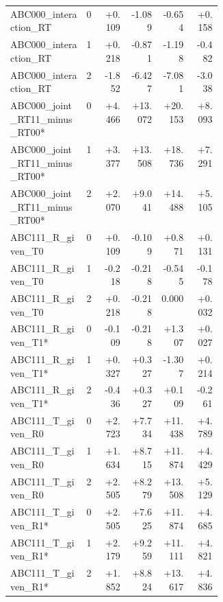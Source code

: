 \begin{longtable}{@{}p{0.36\linewidth}rrrrr@{}}
ABC000\_\allowbreak{}interaction\_\allowbreak{}RT & 0 & +0.109 & -1.089 & -0.654 & +0.158 \\
ABC000\_\allowbreak{}interaction\_\allowbreak{}RT & 1 & +0.218 & -0.871 & -1.198 & -0.482 \\
ABC000\_\allowbreak{}interaction\_\allowbreak{}RT & 2 & -1.852 & -6.427 & -7.081 & -3.038 \\
ABC000\_\allowbreak{}joint\_\allowbreak{}RT11\_\allowbreak{}minus\_\allowbreak{}RT00* & 0 & +4.466 & +13.072 & +20.153 & +8.093 \\
ABC000\_\allowbreak{}joint\_\allowbreak{}RT11\_\allowbreak{}minus\_\allowbreak{}RT00* & 1 & +3.377 & +13.508 & +18.736 & +7.291 \\
ABC000\_\allowbreak{}joint\_\allowbreak{}RT11\_\allowbreak{}minus\_\allowbreak{}RT00* & 2 & +2.070 & +9.041 & +14.488 & +5.105 \\
ABC111\_\allowbreak{}R\_\allowbreak{}given\_\allowbreak{}T0 & 0 & +0.109 & -0.109 & +0.871 & +0.131 \\
ABC111\_\allowbreak{}R\_\allowbreak{}given\_\allowbreak{}T0 & 1 & -0.218 & -0.218 & -0.545 & -0.178 \\
ABC111\_\allowbreak{}R\_\allowbreak{}given\_\allowbreak{}T0 & 2 & +0.218 & -0.218 & 0.000 & +0.032 \\
ABC111\_\allowbreak{}R\_\allowbreak{}given\_\allowbreak{}T1* & 0 & -0.109 & -0.218 & +1.307 & +0.027 \\
ABC111\_\allowbreak{}R\_\allowbreak{}given\_\allowbreak{}T1* & 1 & +0.327 & +0.327 & -1.307 & +0.214 \\
ABC111\_\allowbreak{}R\_\allowbreak{}given\_\allowbreak{}T1* & 2 & -0.436 & +0.327 & +0.109 & -0.261 \\
ABC111\_\allowbreak{}T\_\allowbreak{}given\_\allowbreak{}R0 & 0 & +2.723 & +7.734 & +11.438 & +4.789 \\
ABC111\_\allowbreak{}T\_\allowbreak{}given\_\allowbreak{}R0 & 1 & +1.634 & +8.715 & +11.874 & +4.429 \\
ABC111\_\allowbreak{}T\_\allowbreak{}given\_\allowbreak{}R0 & 2 & +2.505 & +8.279 & +13.508 & +5.129 \\
ABC111\_\allowbreak{}T\_\allowbreak{}given\_\allowbreak{}R1* & 0 & +2.505 & +7.625 & +11.874 & +4.685 \\
ABC111\_\allowbreak{}T\_\allowbreak{}given\_\allowbreak{}R1* & 1 & +2.179 & +9.259 & +11.111 & +4.821 \\
ABC111\_\allowbreak{}T\_\allowbreak{}given\_\allowbreak{}R1* & 2 & +1.852 & +8.824 & +13.617 & +4.836 \\

\end{longtable}
